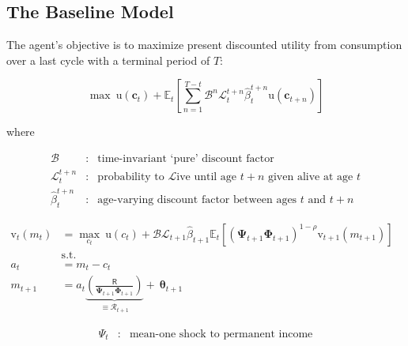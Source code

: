 \documentclass{article}
\newcommand{\DiscFac}{\beta}
\newcommand{\uFunc}{\mathrm{u}}
\newcommand{\Alive}{\mathcal{L}}
\newcommand{\cLvl}{\mathbf{c}}
\newcommand{\Ex}{\mathbb{E}}
\newcommand{\beth}{\mathcal{B}}
\newcommand{\CRRA}{\rho}
\newcommand{\PermGroFac}{\pmb{\Phi}}
\newcommand{\vFunc}{\mathrm{v}}
\newcommand{\Rfree}{\mathsf{R}}
\newcommand{\PermShk}{\mathbf{\Psi}}
\newcommand{\aNrm}{a}
\newcommand{\cNrm}{c}
\newcommand{\RNrm}{\mathcal{R}}
\newcommand{\TranShkEmp}{\pmb{\theta}}
\begin{document}
\subsection{The Baseline Model}\label{The Baseline Model}

The agent's objective is to maximize present discounted utility from consumption over a last cycle with a terminal period of $T$:

\begin{equation}
\label{eq:MaxProb}
\max ~ \uFunc({\cLvl}_{t}) + \Ex_{t}\left[ \sum_{n=1}^{T-t} {\beth}^{n} \Alive_{t}^{t+n}\hat{\DiscFac}_{t}^{t+n} \uFunc({\cLvl}_{t+n})\right]
\end{equation}

where

\begin{equation}
\begin{align}
       \beth &:&\text{time-invariant `pure' discount factor}
       \\ \Alive _{t}^{t+n} & : & \text{probability to }\Alive\text{ive until age $t+n$ given alive at age $t$}
  \\  \hat{\DiscFac}_{t}^{t+n} &:&\text{age-varying discount factor between ages $t$ and $t+n$}
\end{align}
\end{equation}

\begin{equation}
\begin{align}
  {\vFunc}_{t}({m}_{t}) & = \max_{\cNrm_{t}} ~  \uFunc(\cNrm_{t})+\beth\Alive_{t+1}\hat{\DiscFac}_{t+1}
  \Ex_{t}[(\PermShk_{t+1}\PermGroFac_{t+1})^{1-\CRRA}{\vFunc}_{t+1}({m}_{t+1})]                                 \\
                        & \text{s.t.}                                                               & \nonumber \\
  \aNrm_{t}               & = {m}_{t}-\cNrm_{t} \nonumber
  \\  {m}_{t+1}  & = \aNrm_{t}\underbrace{\left(\frac{\Rfree}{\PermShk_{t+1}\PermGroFac_{t+1}}\right)}_{\equiv \RNrm_{t+1}}+ ~\TranShkEmp_{t+1}
\end{align}
\end{equation}

\begin{equation}
\begin{align}
      \Psi_{t} &:&\text{mean-one shock to permanent income}
\end{align}
\end{equation}
\end{document}
